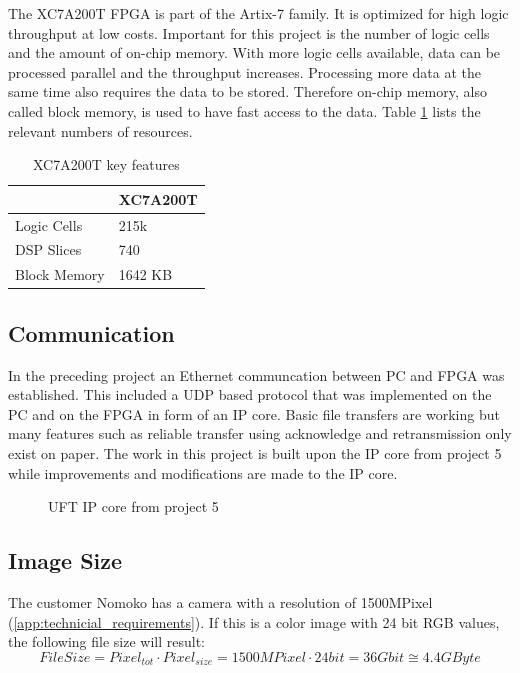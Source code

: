 The XC7A200T FPGA is part of the Artix-7 family. It is optimized for high logic
throughput at low costs. Important for this project is the number of logic cells
and the amount of on-chip memory. With more logic cells available, data can be
processed parallel and the throughput increases. Processing more data at the
same time also requires the data to be stored. Therefore on-chip memory, also
called block memory, is used to have fast access to the data. Table 
\ref{tab:XC7A200T} lists the relevant numbers of resources.

\begin{table}[tb!]
    \centering
    \begin{tabular}{l l}
        \toprule
         & XC7A200T \\
        \midrule
        Logic Cells & 215k \\
        DSP Slices & 740 \\
        Block Memory & 1642 KB \\
        \bottomrule
    \end{tabular}
    \caption{XC7A200T key features \cite{xilinx_ac701}}
    \label{tab:XC7A200T}
\end{table}


\subsection{Communication} \label{chapt:mission:communication} 
In the preceding project \cite{p5report} an Ethernet communcation between PC and
FPGA was established. This included a UDP based protocol that was implemented on
the PC and on the FPGA in form of an IP core. Basic file transfers are working
but many features such as reliable transfer using acknowledge and retransmission
only exist on paper. The work in this project is built
upon the IP core from project 5 while improvements and modifications are made to
the IP core.

\begin{figure}[tb!]
    \centering
    \caption{UFT IP core from project 5 \cite{p5report}}
    \label{fig:uftipcorep5}
\end{figure}


\subsection{Image Size}
The customer Nomoko has a camera with a resolution of 1500MPixel (\ref{app:technicial_requirements}). If this is a color image with 24 bit RGB values, the following file size will result:
\begin{equation}
    File Size = Pixel_{tot} \cdot Pixel_{size} = 1500MPixel \cdot 24bit = 36Gbit \cong 4.4GByte
    \label{eq:filesize}
\end{equation}

